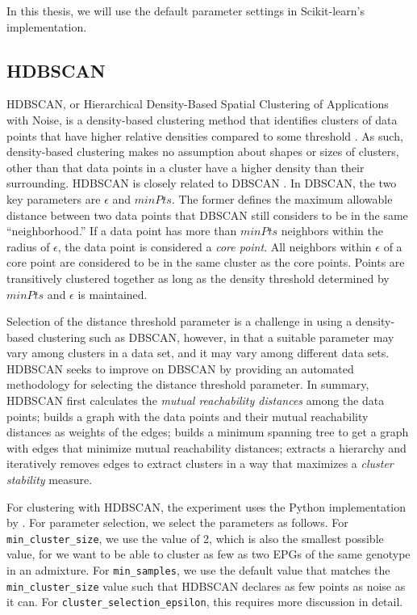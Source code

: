 In this thesis, we will use the default parameter settings in Scikit-learn's implementation.

\subsection{HDBSCAN}
\label{subsection:HDBSCAN}

HDBSCAN, or Hierarchical Density-Based Spatial Clustering of Applications with Noise, is a density-based clustering method that identifies clusters of data points that have higher relative densities compared to some threshold \cite{hutchison_density-based_2013}\cite{mcinnes_accelerated_2017}. As such, density-based clustering makes no assumption about shapes or sizes of clusters, other than that data points in a cluster have a higher density than their surrounding. HDBSCAN is closely related to DBSCAN \cite{ester_density-based_1996}\cite{schubert_dbscan_2017}. In DBSCAN, the two key parameters are $\epsilon$ and $minPts$. The former defines the maximum allowable distance between two data points that DBSCAN still considers to be in the same ``neighborhood.'' If a data point has more than $minPts$ neighbors within the radius of $\epsilon$, the data point is considered a \textit{core point}. All neighbors within $\epsilon$ of a core point are considered to be in the same cluster as the core points. Points are transitively clustered together as long as the density threshold determined by $minPts$ and $\epsilon$ is maintained.

Selection of the distance threshold parameter is a challenge in using a density-based clustering such as DBSCAN, however, in that a suitable parameter may vary among clusters in a data set, and it may vary among different data sets. HDBSCAN seeks to improve on DBSCAN by providing an automated methodology for selecting the distance threshold parameter. In summary, HDBSCAN first calculates the \textit{mutual reachability distances} among the data points; builds a graph with the data points and their mutual reachability distances as weights of the edges; builds a minimum spanning tree to get a graph with edges that minimize mutual reachability distances; extracts a hierarchy and iteratively removes edges to extract clusters in a way that maximizes a \textit{cluster stability} measure.

For clustering with HDBSCAN, the experiment uses the Python implementation by \cite{mcinnes_hdbscan_2017}. For parameter selection, we select the parameters as follows. For \texttt{min\_cluster\_size}, we use the value of 2, which is also the smallest possible value, for we want to be able to cluster as few as two EPGs of the same genotype in an admixture. For \texttt{min\_samples}, we use the default value that matches the \texttt{min\_cluster\_size} value such that HDBSCAN declares as few points as noise as it can. For \texttt{cluster\_selection\_epsilon}, this requires more discussion in detail.

